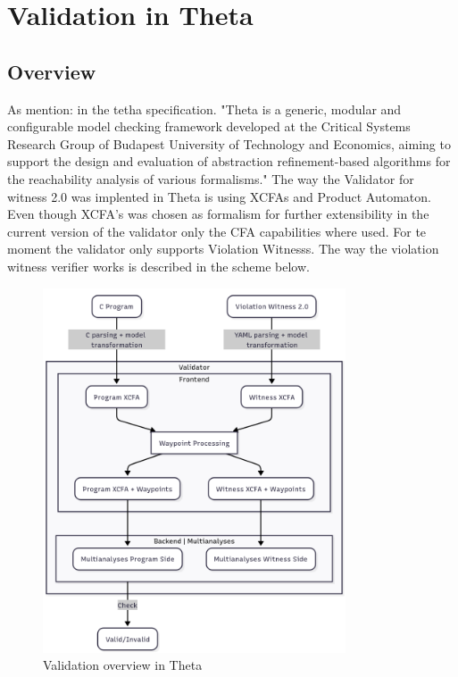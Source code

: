 \chapter{Validation in Theta}
\section{Overview}
As mention: in the tetha specification.
"Theta is a generic, modular and configurable model checking framework developed at the Critical Systems Research Group of Budapest University of Technology and Economics, aiming to support the design and evaluation of abstraction refinement-based algorithms for the reachability analysis of various formalisms."
The way the Validator for witness 2.0 was implented in Theta is using XCFAs and Product Automaton. Even though 
XCFA's was chosen as formalism for further extensibility in the current version of the validator only the CFA
capabilities where used. For te moment the validator only supports Violation Witnesss. The way the violation
witness verifier works is described in the scheme below.

\begin{figure}[h]
    \centering
    \includegraphics[width=0.8\textwidth]{figures/thetaValidator.png}
    \caption{Validation overview in Theta}
    \label{fig:Validation in Theta}
\end{figure}

